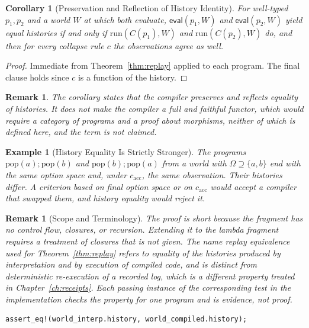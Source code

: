 \documentclass[12pt,oneside,openany]{book}
\theoremstyle{spherepop}
\newtheorem{corollary}[definition]{Corollary}
\theoremstyle{remarkstyle}
\newtheorem{remark}[definition]{Remark}
\newtheorem{example}[definition]{Example}
\newcommand{\eval}{\mathsf{eval}}
\begin{document}
\begin{corollary}[Preservation and Reflection of History Identity]
\label{cor:full-faithful}
For well-typed $p_1,p_2$ and a world $W$ at which both evaluate, $\eval(p_1,W)$ and $\eval(p_2,W)$ yield equal histories if and only if $\mathrm{run}(C(p_1),W)$ and $\mathrm{run}(C(p_2),W)$ do, and then for every collapse rule $c$ the observations agree as well.
\end{corollary}

\begin{proof}
Immediate from Theorem~\ref{thm:replay} applied to each program. The final clause holds since $c$ is a function of the history.
\end{proof}

\begin{remark}
The corollary states that the compiler preserves and reflects equality of histories. It does not make the compiler a full and faithful functor, which would require a category of programs and a proof about morphisms, neither of which is defined here, and the term is not claimed.
\end{remark}

\begin{example}[History Equality Is Strictly Stronger]
\label{ex:strict}
The programs $\mathrm{pop}(a);\mathrm{pop}(b)$ and $\mathrm{pop}(b);\mathrm{pop}(a)$ from a world with $\Omega\supseteq\{a,b\}$ end with the same option space and, under $c_{\mathrm{acc}}$, the same observation. Their histories differ. A criterion based on final option space or on $c_{\mathrm{acc}}$ would accept a compiler that swapped them, and history equality would reject it.
\end{example}

\begin{remark}[Scope and Terminology]
The proof is short because the fragment has no control flow, closures, or recursion. Extending it to the lambda fragment requires a treatment of closures that is not given. The name \emph{replay equivalence} used for Theorem~\ref{thm:replay} refers to equality of the histories produced by interpretation and by execution of compiled code, and is distinct from deterministic re-execution of a recorded log, which is a different property treated in Chapter~\ref{ch:receipts}. Each passing instance of the corresponding test in the implementation checks the property for one program and is evidence, not proof.
\begin{lstlisting}
assert_eq!(world_interp.history, world_compiled.history);
\end{lstlisting}
\end{remark}
\end{document}
